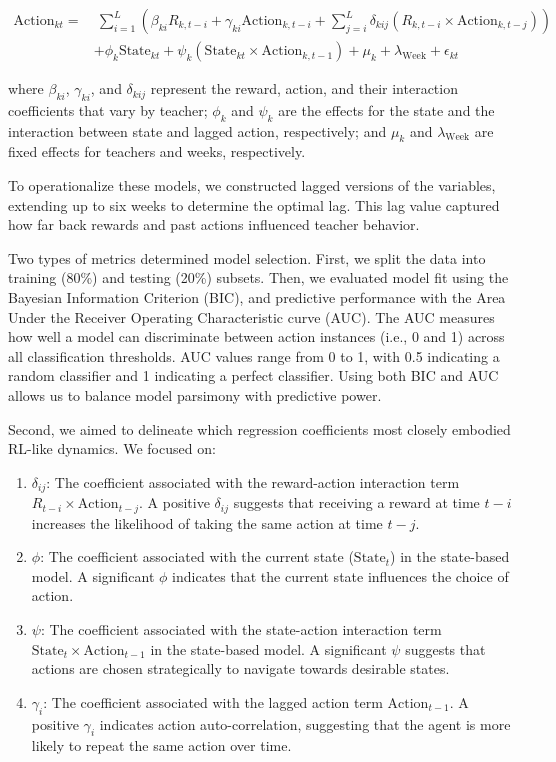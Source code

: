 \documentclass[
  number,
  preprint,
  3p,
  onecolumn]{elsarticle}
\begin{document}
\begin{align*}
\text{Action}_{kt} =& \ \sum_{i=1}^{L} \left( \beta_{ki} R_{k, t-i} + \gamma_{ki} \text{Action}_{k, t-i} + \sum_{j=i}^{L} \delta_{kij} (R_{k, t-i} \times \text{Action}_{k, t-j}) \right) \\
& + \phi_k \text{State}_{kt} + \psi_k (\text{State}_{kt} \times \text{Action}_{k, t-1}) + \mu_k + \lambda_{\text{Week}} + \epsilon_{kt}
\end{align*}

where \(\beta_{ki}\), \(\gamma_{ki}\), and \(\delta_{kij}\) represent
the reward, action, and their interaction coefficients that vary by
teacher; \(\phi_k\) and \(\psi_k\) are the effects for the state and the
interaction between state and lagged action, respectively; and \(\mu_k\)
and \(\lambda_{\text{Week}}\) are fixed effects for teachers and weeks,
respectively.

To operationalize these models, we constructed lagged versions of the
variables, extending up to six weeks to determine the optimal lag. This
lag value captured how far back rewards and past actions influenced
teacher behavior.

Two types of metrics determined model selection. First, we split the
data into training (80\%) and testing (20\%) subsets. Then, we evaluated
model fit using the Bayesian Information Criterion (BIC), and predictive
performance with the Area Under the Receiver Operating Characteristic
curve (AUC). The AUC measures how well a model can discriminate between
action instances (i.e., 0 and 1) across all classification thresholds.
AUC values range from 0 to 1, with 0.5 indicating a random classifier
and 1 indicating a perfect classifier. Using both BIC and AUC allows us
to balance model parsimony with predictive power.

Second, we aimed to delineate which regression coefficients most closely
embodied RL-like dynamics. We focused on:

\begin{enumerate}
\def\labelenumi{\alph{enumi})}
\item
  \(\delta_{ij}\): The coefficient associated with the reward-action
  interaction term \(R_{t-i} \times \text{Action}_{t-j}\). A positive
  \(\delta_{ij}\) suggests that receiving a reward at time \(t-i\)
  increases the likelihood of taking the same action at time \(t-j\).
\item
  \(\phi\): The coefficient associated with the current state
  (\(\text{State}_{t}\)) in the state-based model. A significant
  \(\phi\) indicates that the current state influences the choice of
  action.
\item
  \(\psi\): The coefficient associated with the state-action interaction
  term \(\text{State}_{t} \times \text{Action}_{t-1}\) in the
  state-based model. A significant \(\psi\) suggests that actions are
  chosen strategically to navigate towards desirable states.
\item
  \(\gamma_i\): The coefficient associated with the lagged action term
  \(\text{Action}_{t-1}\). A positive \(\gamma_i\) indicates action
  auto-correlation, suggesting that the agent is more likely to repeat
  the same action over time.
\end{enumerate}
\end{document}
